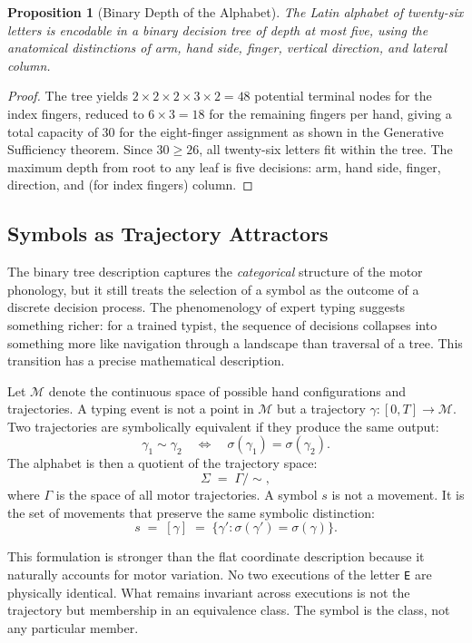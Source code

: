 \documentclass[12pt,a4paper]{article}
\theoremstyle{plain}
\newtheorem{proposition}{Proposition}
\theoremstyle{definition}
\theoremstyle{remark}
\begin{document}
\begin{proposition}[Binary Depth of the Alphabet]
The Latin alphabet of twenty-six letters is encodable in a binary decision
tree of depth at most five, using the anatomical distinctions of arm, hand
side, finger, vertical direction, and lateral column.
\end{proposition}

\begin{proof}
The tree yields $2 \times 2 \times 2 \times 3 \times 2 = 48$ potential
terminal nodes for the index fingers, reduced to $6 \times 3 = 18$ for the
remaining fingers per hand, giving a total capacity of $30$ for the
eight-finger assignment as shown in the Generative Sufficiency theorem.
Since $30 \geq 26$, all twenty-six letters fit within the tree. The maximum
depth from root to any leaf is five decisions: arm, hand side, finger, direction,
and (for index fingers) column.
\end{proof}

\subsection{Symbols as Trajectory Attractors}

The binary tree description captures the \emph{categorical} structure of the
motor phonology, but it still treats the selection of a symbol as the outcome
of a discrete decision process. The phenomenology of expert typing suggests
something richer: for a trained typist, the sequence of decisions collapses
into something more like navigation through a landscape than traversal of a
tree. This transition has a precise mathematical description.

Let $\mathcal{M}$ denote the continuous space of possible hand configurations
and trajectories. A typing event is not a point in $\mathcal{M}$ but a
trajectory $\gamma : [0, T] \rightarrow \mathcal{M}$. Two trajectories are
symbolically equivalent if they produce the same output:
\[
  \gamma_1 \sim \gamma_2
  \quad\Longleftrightarrow\quad
  \sigma(\gamma_1) = \sigma(\gamma_2).
\]
The alphabet is then a quotient of the trajectory space:
\[
  \Sigma \;=\; \Gamma / {\sim},
\]
where $\Gamma$ is the space of all motor trajectories. A symbol $s$ is not a
movement. It is the set of movements that preserve the same symbolic distinction:
\[
  s \;=\; [\gamma] \;=\; \{\gamma' : \sigma(\gamma') = \sigma(\gamma)\}.
\]

This formulation is stronger than the flat coordinate description because it
naturally accounts for motor variation. No two executions of the letter
\texttt{E} are physically identical. What remains invariant across executions
is not the trajectory but membership in an equivalence class. The symbol is
the class, not any particular member.
\end{document}
